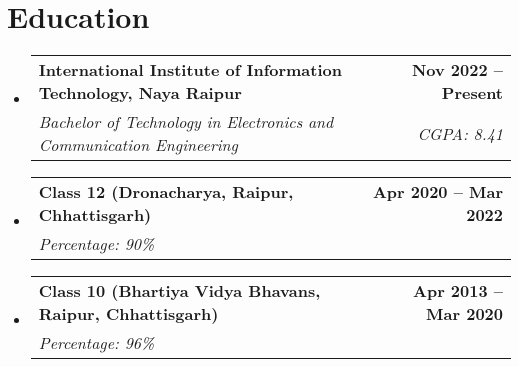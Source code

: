 \documentclass[letterpaper,11pt]{article}
\makeatletter
\newcommand{\resumeEducation}[4]{
  \vspace{-2pt}\item
    \begin{tabular*}{\textwidth}{l@{\extracolsep{\fill}}r}
      \textbf{#1} & \textbf{#3} \\
      \textit{\small#2} & \textit{#4} \\
    \end{tabular*}\vspace{-7pt}
}
\newcommand{\resumeSubHeadingListStart}{\begin{itemize}[leftmargin=0.15in, label={}]}
\newcommand{\resumeSubHeadingListEnd}{\end{itemize}}
\makeatother
\begin{document}
\section{Education}
\resumeSubHeadingListStart
  \resumeEducation
    {International Institute of Information Technology, Naya Raipur}
    {Bachelor of Technology in Electronics and Communication Engineering}
    {Nov 2022 -- Present}
    {CGPA: 8.41}

  \resumeEducation
    {Class 12 (Dronacharya, Raipur, Chhattisgarh)}
    {Percentage: 90\%}
    {Apr 2020 -- Mar 2022}
    {}

  \resumeEducation
    {Class 10 (Bhartiya Vidya Bhavans, Raipur, Chhattisgarh)}
    {Percentage: 96\%}
    {Apr 2013 -- Mar 2020}
    {}
\resumeSubHeadingListEnd
\end{document}
